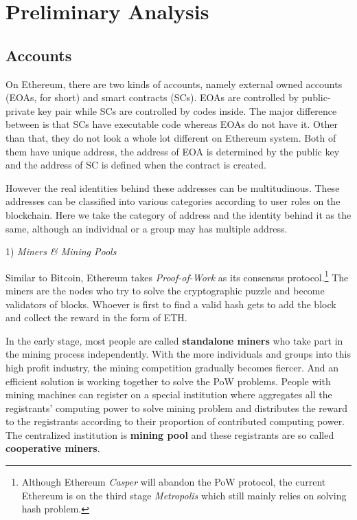 
\section{Preliminary Analysis}
\subsection{Accounts}
On Ethereum, there are two kinds of accounts, namely external owned accounts (EOAs, for short) and smart contracts (SCs). EOAs are controlled by public-private key pair while SCs are controlled by codes inside. The major difference between is that SCs have executable code whereas EOAs do not have it. Other than that, they do not look a whole lot different on Ethereum system. Both of them have unique address, the address of EOA is determined by the public key and the address of SC is defined when the contract is created.  

However the real identities behind these addresses can be multitudinous. These addresses can be classified into various categories according to user roles on the blockchain. Here we take the category of address and the identity behind it as the same, although an individual or a group may has multiple address.

1) \emph{Miners \& Mining Pools}

Similar to Bitcoin, Ethereum takes \emph{Proof-of-Work} as its consensus protocol.\footnote{Although Ethereum \emph{Casper} will abandon the PoW protocol, the current Ethereum is on the third stage \emph{Metropolis} which still mainly relies on solving hash problem.} The miners are the nodes who try to solve the cryptographic puzzle and become validators of blocks. Whoever is first to find a valid hash gets to add the block and collect the reward in the form of ETH.

In the early stage, most people are called \textbf{standalone miners} who take part in the mining process independently. With the more individuals and groups into this high profit industry, the mining competition gradually becomes fiercer. And an efficient solution is working together to solve the PoW problems. People with mining machines can register on a special institution where aggregates all the registrants' computing power to solve mining problem and distributes the reward to the registrants according to their proportion of contributed computing power. The centralized institution is \textbf{mining pool} and these registrants are so called \textbf{cooperative miners}.

